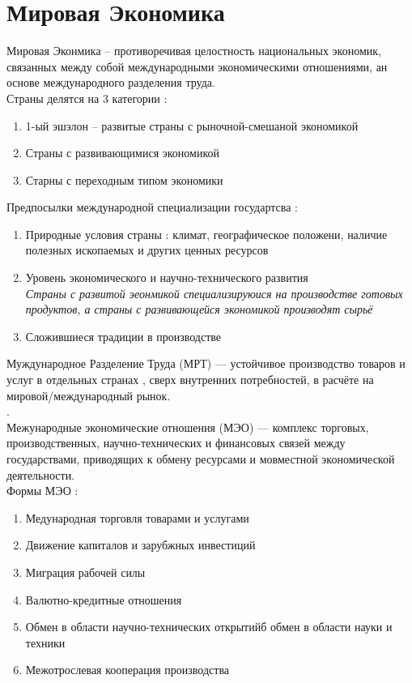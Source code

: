 \documentclass[12pt,a4paper]{book}
\begin{document}
\section{Мировая Экономика}
Мировая Эконмика -- противоречивая целостность национальных экономик, связанных между собой международными экономическими отношениями, ан основе международного разделения труда.\\
Страны делятся на 3 категории :
\begin{enumerate}
	\item 1-ый эшэлон -- развитые страны с рыночной-смешаной экономикой
	\item Страны с  развивающимися экономикой
	\item Старны с переходным типом экономики
\end{enumerate}
Предпосылки международной специализации государтсва :
\begin{enumerate}
	\item Природные условия страны : климат, географическое положени, наличие полезных ископаемых и других ценных ресурсов
	\item Уровень экономического и научно-технического развития\\
	\emph{Страны с развитой эеонмикой специализируюися на производстве готовых продуктов, а страны с развивающейся экономикой производят сырьё}
	\item Сложившиеся традиции в производстве
\end{enumerate}
Муждународное Разделение Труда (МРТ) --- устойчивое  производство товаров и услуг в отдельных странах , сверх внутренних потребностей, в расчёте на мировой/международный рынок.\\.\\
Межународные экономические отношения (МЭО) --- комплекс торговых, производственных, научно-технических и финансовых связей между государствами, приводящих к обмену ресурсами и мовместной экономической деятельности.\\
Формы МЭО :
\begin{enumerate}
	\item Медународная торговля товарами и услугами 
	\item Движение капиталов и зарубжных инвестиций
	\item Миграция рабочей силы 
	\item Валютно-кредитные отношения
	\item Обмен в области научно-технических открытийб обмен в области науки и техники
	\item Межотрослевая кооперация производства
\end{enumerate}
\end{document}
